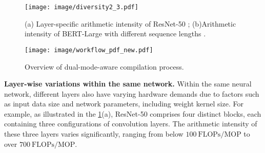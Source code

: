 \begin{figure}[t]
    \centering
    \texttt{[image: image/diversity2\_3.pdf]}
    \caption{(a) Layer-specific arithmetic intensity of ResNet-50 \cite{he2016deep}; (b)Arithmetic intensity of BERT-Large with different sequence lengths \cite{devlin2018bert}.}
    \label{fig:layer}
\end{figure}

\begin{figure*}[t]
    \centering
    \texttt{[image: image/workflow\_pdf\_new.pdf]}
    \caption{Overview of dual-mode-aware compilation process.}
    \label{fig: workflow}
\end{figure*}


\noindent
\textbf{Layer-wise variations within the same network.} Within the same neural network, different layers also have varying hardware demands due to factors such as input data size and network parameters, including weight kernel size. 
For example, as illustrated in the \fig \ref{fig:layer}(a), ResNet-50\cite{he2016deep} comprises four distinct blocks, each containing three configurations of convolution layers. The arithmetic intensity of these three layers varies significantly, ranging from below $100~\mathrm{FLOPs/MOP}$ to over $700~\mathrm{FLOPs/MOP}$.

 

